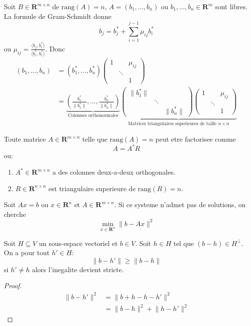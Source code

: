 Soit $B\in \mathbf{R}^{m\times n}$ de $\mathrm{rang}(A)=n$, $A=(b_{1},\dots,b_{n})$ ou $b_{1},\dots,b_{n}\in \mathbf{R}^{m}$ sont libres. La formule de Gram-Schmidt donne
$$
b_{j}=b_{j}^{*}+\sum_{i=1}^{j-1} \mu _{ij}b_{i}^{*}
$$
ou $\mu _{ij}=\frac{\langle b_{j},b_{i}^{*} \rangle}{\langle b_{i}^{*},b_{i}^{*} \rangle}$. Donc
\begin{align*}
(b_{1},\dots,b_{n}) & =(b_{1}^{*},\dots,b_{n}^{*})\begin{pmatrix}
1 &  & \mu _{ij} \\
 & \ddots &  \\
 &  & 1
\end{pmatrix} \\
	 & =\underbrace{ \left( \frac{b_{1}^{*}}{\lVert b_{1}^{*} \rVert },\dots, \frac{b_{n}^{*}}{\lVert b_{n}^{*} \rVert }  \right) }_{ \text{Colonnes orthonormales} }\underbrace{ \begin{pmatrix}
\lVert b_{1}^{*}  \rVert &  &  \\
 & \ddots &  \\
 &  & \lVert b_{n}^{*} \rVert 
\end{pmatrix}\begin{pmatrix}
1 &  & \mu _{ij} \\
 & \ddots &  \\
 &  & 1
\end{pmatrix} }_{ \text{Matrices triangulaires superieures de taille }n\times n }
\end{align*}

\begin{theorem}[Factorisation QR de $A$]
Toute matrice $A\in \mathbf{R}^{m\times n}$ telle que $\mathrm{rang}(A)=n$ peut etre factorisee comme 
$$
A=A^{*}R
$$
ou:
\begin{enumerate}
\item $A^{*}\in \mathbf{R}^{m\times n}$ a des colonnes deux-a-deux orthogonales.
\item $R\in \mathbf{R}^{n\times n}$ est triangulaire superieure de $\mathrm{rang}(R)=n$.
\end{enumerate}
\end{theorem}

Soit $Ax=b$ ou $x \in \mathbf{R}^{n}$ et $A\in \mathbf{R}^{m\times n}$. Si ce systeme n'admet pas de solutions, on cherche
$$
\min_{x \in \mathbf{R}^{n}}\lVert b-Ax \rVert ^{2}
$$
\begin{lemma}
Soit $H\subseteq V$ un sous-espace vectoriel et $b\in V$. Soit $h\in H$ tel que $(b-h)\in H^{\perp}$. On a pour tout $h'\in H$:
$$
\lVert b-h' \rVert \ge \lVert b-h \rVert 
$$
si $h'\neq h$ alors l'inegalite devient stricte.
\end{lemma}
\begin{proof}
\begin{align*}
\lVert b -h'  \rVert^{2} & =\lVert b + h -h -h' \rVert^{2} \\
 & =\lVert b-h \rVert^{2}+\lVert h-h' \rVert^{2}
\end{align*}
\end{proof}


